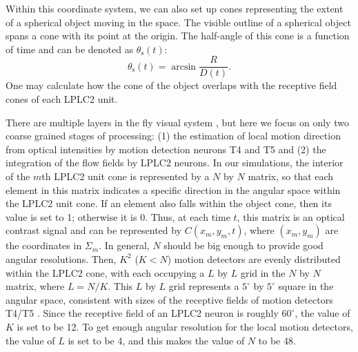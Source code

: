 \documentclass[9pt,lineno]{elife}
\begin{document}
Within this coordinate system, we can also set up cones representing the extent of a spherical object moving in the space. The visible outline of a spherical object spans a cone with its point at the origin. The half-angle of this cone is a function of time and can be denoted as $\theta_{\text{s}}(t)$:
\begin{equation}
\theta_{\text{s}}(t) = \arcsin{\frac{R}{D(t)}}.
\end{equation}
One may calculate how the cone of the object overlaps with the receptive field cones of each LPLC2 unit.

There are multiple layers in the fly visual system \citep{takemura2017comprehensive}, but here we focus on only two coarse grained stages of processing: (1) the estimation of local motion direction from optical intensities by motion detection neurons T4 and T5 and (2) the integration of the flow fields by LPLC2 neurons. In our simulations, the interior of the $m$th LPLC2 unit cone is represented by a $N$ by $N$ matrix, so that each element in this matrix indicates a specific direction in the angular space within the LPLC2 unit cone. If an element also falls within the object cone, then its value is set to 1; otherwise it is 0. Thus, at each time $t$, this matrix is an optical contrast signal and can be represented by $C(x_{m},y_{m},t)$, where $(x_{m},y_{m})$ are the coordinates in $\Sigma_{m}$. In general, $N$ should be big enough to provide good angular resolutions. Then, $K^{2}$ ($K<N$) motion detectors are evenly distributed within the LPLC2 cone, with each occupying a $L$ by $L$ grid in the $N$ by $N$ matrix, where $L=N/K$. This $L$ by $L$ grid represents a $5^{\circ}$ by $5^{\circ}$ square in the angular space, consistent with sizes of the receptive fields of motion detectors T4/T5 \citep{zavatone2020minimal}. Since the receptive field of an LPLC2 neuron is roughly $60^{\circ}$, the value of $K$ is set to be 12. To get enough angular resolution for the local motion detectors, the value of $L$ is set to be 4, and this makes the value of $N$ to be 48. 
\end{document}
